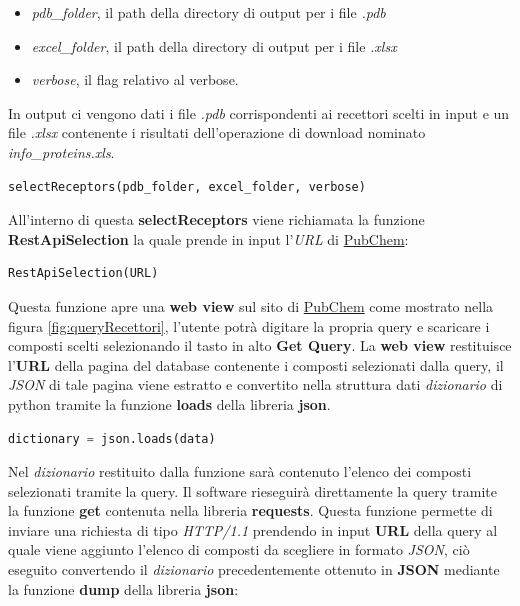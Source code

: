 \begin{itemize}
    \item \textit{pdb\_folder}, il path della directory di output per i file \textit{.pdb}
    \item \textit{excel\_folder}, il path della directory di output per i file \textit{.xlsx}
    \item \textit{verbose}, il flag relativo al verbose.
\end{itemize}

In output ci vengono dati i file \textit{.pdb} corrispondenti ai recettori scelti in input e un file \textit{.xlsx} contenente i risultati dell'operazione di download nominato \textit{info\_proteins.xls}.

\begin{lstlisting}[language=Python, label=lst:code12, caption={funzione selectReceptors}]
selectReceptors(pdb_folder, excel_folder, verbose)
\end{lstlisting}

All'interno di questa \textbf{selectReceptors} viene richiamata la funzione \textbf{RestApiSelection} la quale prende in input l'\textit{URL} di \href{https://www.rcsb.org/search}{PubChem}:

\begin{lstlisting}[language=Python, label=lst:code13, caption={funzione RestApiSelection}]
RestApiSelection(URL)
\end{lstlisting}

Questa funzione apre una \textbf{web view} sul sito di \href{https://www.rcsb.org/search}{PubChem} come mostrato nella figura \ref{fig:queryRecettori}, l'utente potrà digitare la propria query e scaricare i composti scelti selezionando il tasto in alto \textbf{Get Query}.\newline
La \textbf{web view} restituisce l'\textbf{URL} della pagina del database contenente i composti selezionati dalla query, il \textit{JSON} di tale pagina viene estratto e convertito nella struttura dati \textit{dizionario} di python tramite la funzione \textbf{loads} della libreria \textbf{json}.

\begin{lstlisting}[language=Python, label=lst:code14, caption={funzione json.loads}]
dictionary = json.loads(data)
\end{lstlisting}

Nel \textit{dizionario} restituito dalla funzione sarà contenuto l'elenco dei composti selezionati tramite la query.\newline
Il software rieseguirà direttamente la query tramite la funzione \textbf{get} contenuta nella libreria \textbf{requests}. Questa funzione permette di inviare una richiesta di tipo \textit{HTTP/1.1} prendendo in input \textbf{URL} della query al quale viene aggiunto l'elenco di composti da scegliere in formato \textit{JSON}, ciò eseguito convertendo il \textit{dizionario} precedentemente ottenuto in \textbf{JSON}
mediante la funzione \textbf{dump} della libreria \textbf{json}:


